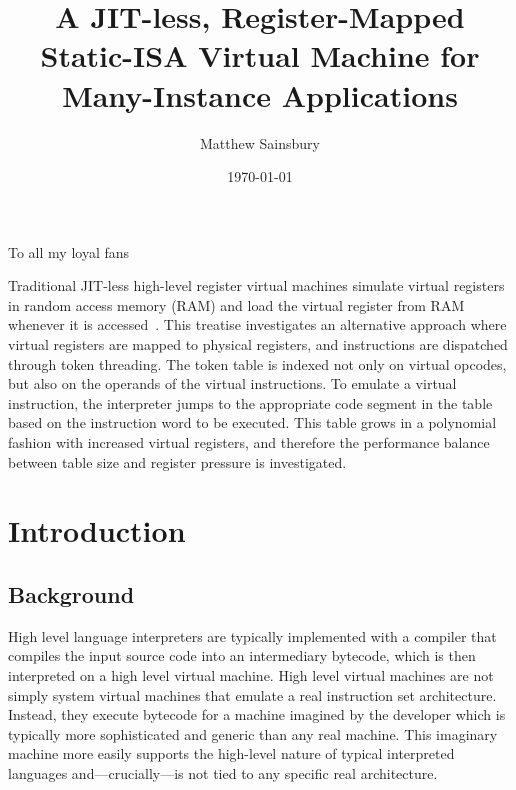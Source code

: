 



\title{A JIT-less, Register-Mapped Static-ISA Virtual Machine for Many-Instance Applications}
\author{Matthew Sainsbury}
\date{\today}

\begin{titlepage}
	\maketitle
\end{titlepage}


To all my loyal fans

Traditional JIT-less high-level register virtual machines simulate virtual registers in random access memory (RAM) and load the virtual register from RAM whenever it is accessed~\citep{caseregistervm}. This treatise investigates an alternative approach where virtual registers are mapped to physical registers, and instructions are dispatched through token threading. The token table is indexed not only on virtual opcodes, but also on the operands of the virtual instructions. To emulate a virtual instruction, the interpreter jumps to the appropriate code segment in the table based on the instruction word to be executed. This table grows in a polynomial fashion with increased virtual registers, and therefore the performance balance between table size and register pressure is investigated.


\tableofcontents



\chapter{Introduction}
	\startrealnumbers
		
	\section{Background}
	High level language interpreters are typically implemented with a compiler that compiles the input source code into an intermediary bytecode, which is then interpreted on a high level virtual machine. High level virtual machines are not simply system virtual machines that emulate a real instruction set architecture. \citep{smithvmarticle} Instead, they execute bytecode for a machine imagined by the developer which is typically more sophisticated and generic than any real machine. This imaginary machine more easily supports the high-level nature of typical interpreted languages and---crucially---is not tied to any specific real architecture.
	

